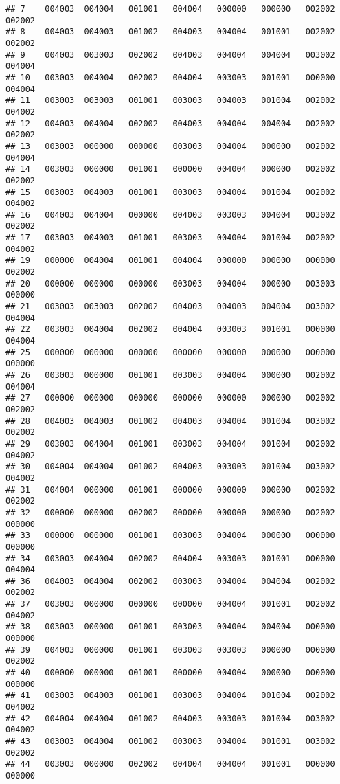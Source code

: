 \documentclass[
]{article}
\begin{document}
\begin{verbatim}
## 7    004003  004004   001001   004004   000000   000000   002002   002002
## 8    004003  004003   001002   004003   004004   001001   002002   002002
## 9    004003  003003   002002   004003   004004   004004   003002   004004
## 10   003003  004004   002002   004004   003003   001001   000000   004004
## 11   003003  003003   001001   003003   004003   001004   002002   004002
## 12   004003  004004   002002   004003   004004   004004   002002   002002
## 13   003003  000000   000000   003003   004004   000000   002002   004004
## 14   003003  000000   001001   000000   004004   000000   002002   002002
## 15   003003  004003   001001   003003   004004   001004   002002   004002
## 16   004003  004004   000000   004003   003003   004004   003002   002002
## 17   003003  004003   001001   003003   004004   001004   002002   004002
## 19   000000  004004   001001   004004   000000   000000   000000   002002
## 20   000000  000000   000000   003003   004004   000000   003003   000000
## 21   003003  003003   002002   004003   004003   004004   003002   004004
## 22   003003  004004   002002   004004   003003   001001   000000   004004
## 25   000000  000000   000000   000000   000000   000000   000000   000000
## 26   003003  000000   001001   003003   004004   000000   002002   004004
## 27   000000  000000   000000   000000   000000   000000   002002   002002
## 28   004003  004003   001002   004003   004004   001004   003002   002002
## 29   003003  004004   001001   003003   004004   001004   002002   004002
## 30   004004  004004   001002   004003   003003   001004   003002   004002
## 31   004004  000000   001001   000000   000000   000000   002002   002002
## 32   000000  000000   002002   000000   000000   000000   002002   000000
## 33   000000  000000   001001   003003   004004   000000   000000   000000
## 34   003003  004004   002002   004004   003003   001001   000000   004004
## 36   004003  004004   002002   003003   004004   004004   002002   002002
## 37   003003  000000   000000   000000   004004   001001   002002   004002
## 38   003003  000000   001001   003003   004004   004004   000000   000000
## 39   004003  000000   001001   003003   003003   000000   000000   002002
## 40   000000  000000   001001   000000   004004   000000   000000   000000
## 41   003003  004003   001001   003003   004004   001004   002002   004002
## 42   004004  004004   001002   004003   003003   001004   003002   004002
## 43   003003  004004   001002   003003   004004   001001   003002   002002
## 44   003003  000000   002002   004004   004004   001001   000000   000000

\end{verbatim}
\end{document}
